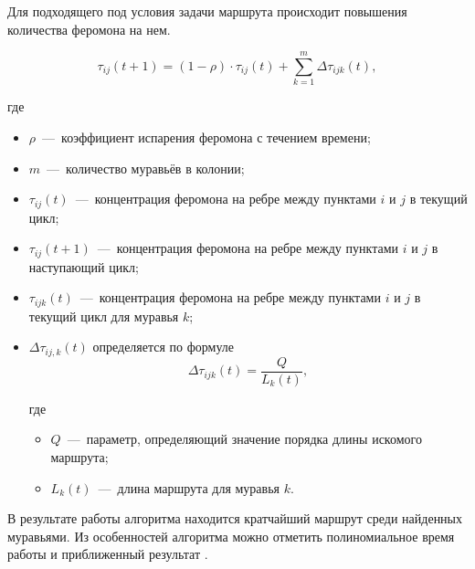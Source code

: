 Для подходящего под условия задачи маршрута происходит повышения количества феромона на нем.

\begin{equation}
	\tau_{ij}(t + 1) = (1 - \rho) \cdot \tau_{ij}(t) + \sum_{k=1}^m \Delta\tau_{ijk}(t),
\end{equation}

где
\begin{itemize}
	\item $\rho$~---~коэффициент испарения феромона с течением времени;
	\item $m$~---~количество муравьёв в колонии;
	\item $\tau_{ij}(t)$~---~концентрация феромона на ребре между пунктами $i$ и $j$ в текущий цикл;
	\item $\tau_{ij}(t + 1)$~---~концентрация феромона на ребре между пунктами $i$ и $j$ в наступающий цикл;
	\item $\tau_{ijk}(t)$~---~концентрация феромона на ребре между пунктами $i$ и $j$ в текущий цикл для муравья $k$;
	\item $\Delta\tau_{ij,k}(t)$ определяется по формуле \begin{equation}
	\Delta\tau_{ijk}(t) = \frac{Q}{L_k(t)},
	\end{equation}
	
	где 
	
	\begin{itemize}
	\item $Q$~---~параметр, определяющий значение порядка длины искомого маршрута;
	\item $L_k(t)$~---~длина маршрута для муравья $k$.
	\end{itemize}
\end{itemize}

В результате работы алгоритма находится кратчайший маршрут среди найденных муравьями. Из особенностей алгоритма можно отметить полиномиальное время работы и приближенный результат \cite{bib:ant}.

\newpage